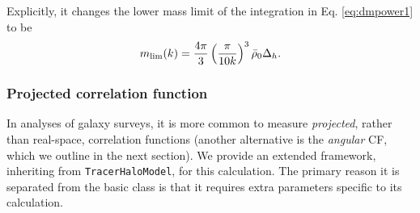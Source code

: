 \documentclass[5p,aas_macros]{elsarticle}
\newcommand{\ztc}[1]{\textcolor{cyan}{\textbf{[ZTC: #1]}}}
\begin{document}
Explicitly, it changes the lower mass limit of the integration in Eq. \ref{eq:dmpower1} to be
\begin{equation}
    m_{\rm lim}(k) = \frac{4\pi}{3} \left(\frac{\pi}{10k}\right)^3 \bar{\rho}_0 \Delta_h.
\end{equation}

\subsubsection{Projected correlation function}
\label{sec:projcorr}
In analyses of galaxy surveys, it is more common to measure \textit{projected}, rather than real-space, correlation functions (another alternative is the \textit{angular} CF, which we outline in the next section).
We provide an extended framework, inheriting from \verb|TracerHaloModel|, for this calculation. The primary reason it is separated from the basic class is that it requires extra parameters specific to its calculation. 



\end{document}
